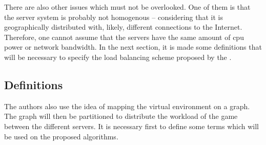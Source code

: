 There are also other issues which must not be overlooked. One of them is that the server system is probably not homogenous -- considering that it is geographically distributed with, likely, different connections to the Internet. Therefore, one cannot assume that the servers have the same amount of cpu power or network bandwidth. %
In the next section, it is made some definitions that will be necessary to specify the load balancing scheme proposed by the \cite{bezerra2009lbs}.


	

\subsection{Definitions}
\label{sec:def}

The authors also use the idea of mapping the virtual environment on a graph. The graph will then be partitioned to distribute the workload of the game between the different servers. It is necessary first to define some terms which will be used on the proposed algorithms.


